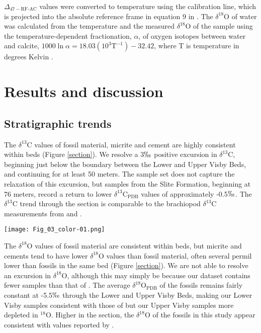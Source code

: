 \documentclass[5p, authoryear]{elsarticle}
\newcommand{\deltao}{$\delta^{18}$}
\newcommand{\deltac}{$\delta^{13}$}
\begin{document}
$\Delta_{47-\text{RF-AC}}$ values were converted to temperature using the \cite{Ghosh2006} calibration line, which is projected into the absolute reference frame in equation 9 in \cite{Dennis2011}. The \deltao O of water was calculated from the temperature and the measured \deltao O of the sample using the temperature-dependent fractionation, $\alpha$, of oxygen isotopes between water and calcite, $1000\ln\alpha=18.03\left(10^3\text{T}^{-1}\right)-32.42$, where T is temperature in degrees Kelvin \citep{Kim1997}. 

\section{Results and discussion}

\subsection{Stratigraphic trends}

The \deltac C values of fossil material, micrite and cement are highly consistent within beds (Figure \ref{section}). We resolve a 3$\permil$ positive excursion in \deltac C, beginning just below the boundary between the Lower and Upper Visby Beds, and continuing for at least 50 meters. The sample set does not capture the relaxation of this excursion, but samples from the Slite Formation, beginning at 76 meters, record a return to lower \deltac C$_{\text{PDB}}$ values of approximately -0.5$\permil$. The \deltac C trend through the section is comparable to the brachiopod \deltac C measurements from \cite{Bickert1997} and \cite{Munnecke2003}. 

\begin{figure*}[b]
\centering
\texttt{[image: Fig\_03\_color-01.png]}
\caption{The \deltac C, \deltao O and clumped isotope temperature of all the samples analyzed in this study, plotted against stratigraphic height. For the Lower \& Upper Visby and H\"{o}gklint Formations, a height of zero meters is defined by the contact between the Lower Visby Beds and the Upper Visby Beds. For the Slite Formation, a height of zero meters is defined as an arbitrary bed near the base of the outcrop. Brachiopod $\delta^{13}$C and $\delta^{18}$O measurements from \cite{Munnecke2003} are also included. Error bars represent the standard error of the mean.}
\label{section}
\end{figure*}

The \deltao O values of fossil material are consistent within beds, but micrite and cements tend to have lower \deltao O values than fossil material, often several permil lower than fossils in the same bed (Figure \ref{section}). We are not able to resolve an excursion in \deltao O, although this may simply be because our dataset contains fewer samples than that of \cite{Munnecke2003}. The average \deltao O$_{\text{PDB}}$ of the fossils remains fairly constant at -5.5$\permil$ through the Lower and Upper Visby Beds, making our Lower Visby samples consistent with those of \cite{Munnecke2003} but our Upper Visby samples more depleted in $^{18}$O. Higher in the section, the \deltao O of the fossils in this study appear consistent with values reported by \cite{Bickert1997}. 
\end{document}
